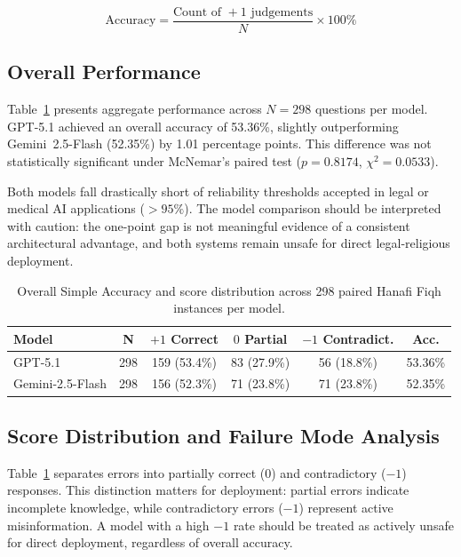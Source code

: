 \documentclass[runningheads]{llncs}
\begin{document}
\begin{equation}
\text{Accuracy} = \frac{\text{Count of }+1\text{ judgements}}{N} \times 100\%
\end{equation}

\subsection{Overall Performance}
Table~\ref{tab:overall} presents aggregate performance across $N=298$ questions per model. GPT-5.1 achieved an overall accuracy of 53.36\%, slightly outperforming Gemini~2.5-Flash (52.35\%) by 1.01 percentage points. This difference was not statistically significant under McNemar's paired test ($p = 0.8174$, $\chi^2 = 0.0533$).

Both models fall drastically short of reliability thresholds accepted in legal or medical AI applications ($>95\%$). The model comparison should be interpreted with caution: the one-point gap is not meaningful evidence of a consistent architectural advantage, and both systems remain unsafe for direct legal-religious deployment.

\begin{table}[t]
\centering
\caption{Overall Simple Accuracy and score distribution across 298 paired Hanafi Fiqh instances per model.}
\label{tab:overall}
\setlength{\tabcolsep}{4pt}
\footnotesize
\begin{tabular}{lccccc}
\toprule
\textbf{Model} & \textbf{N} & \textbf{$+1$ Correct} & \textbf{$0$ Partial} & \textbf{$-1$ Contradict.} & \textbf{Acc.} \\
\midrule
GPT-5.1          & 298 & 159 (53.4\%) & 83 (27.9\%) & 56 (18.8\%) & 53.36\% \\
Gemini-2.5-Flash & 298 & 156 (52.3\%) & 71 (23.8\%) & 71 (23.8\%) & 52.35\% \\
\bottomrule
\end{tabular}
\end{table}

\subsection{Score Distribution and Failure Mode Analysis}
Table~\ref{tab:overall} separates errors into partially correct ($0$) and contradictory ($-1$) responses. This distinction matters for deployment: partial errors indicate incomplete knowledge, while contradictory errors ($-1$) represent active misinformation. A model with a high $-1$ rate should be treated as actively unsafe for direct deployment, regardless of overall accuracy.
\end{document}
